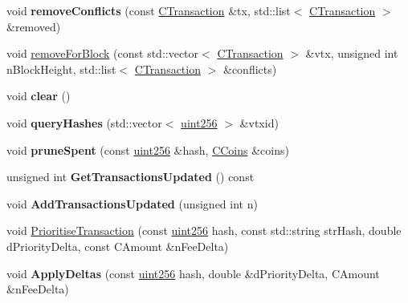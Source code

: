 \begin{DoxyCompactItemize}
\mbox{\label{class_c_tx_mem_pool_a11f1bddfbae7c03c6244db322876c0a7}} 
void {\bfseries remove\+Conflicts} (const \mbox{\hyperlink{class_c_transaction}{C\+Transaction}} \&tx, std\+::list$<$ \mbox{\hyperlink{class_c_transaction}{C\+Transaction}} $>$ \&removed)
\item 
void \mbox{\hyperlink{class_c_tx_mem_pool_ac97207311007676bd7ef056a625e0e0a}{remove\+For\+Block}} (const std\+::vector$<$ \mbox{\hyperlink{class_c_transaction}{C\+Transaction}} $>$ \&vtx, unsigned int n\+Block\+Height, std\+::list$<$ \mbox{\hyperlink{class_c_transaction}{C\+Transaction}} $>$ \&conflicts)
\item 
\mbox{\label{class_c_tx_mem_pool_a6dba6bce4139392751321438a29b6b09}} 
void {\bfseries clear} ()
\item 
\mbox{\label{class_c_tx_mem_pool_a42fa7d41a45562d02e356f2e7708bb02}} 
void {\bfseries query\+Hashes} (std\+::vector$<$ \mbox{\hyperlink{classuint256}{uint256}} $>$ \&vtxid)
\item 
\mbox{\label{class_c_tx_mem_pool_ad6142b7cd3a58dae6cdaf03551c2f989}} 
void {\bfseries prune\+Spent} (const \mbox{\hyperlink{classuint256}{uint256}} \&hash, \mbox{\hyperlink{class_c_coins}{C\+Coins}} \&coins)
\item 
\mbox{\label{class_c_tx_mem_pool_afd2a709a0e6cb34a57ff2f9fd0774e6c}} 
unsigned int {\bfseries Get\+Transactions\+Updated} () const
\item 
\mbox{\label{class_c_tx_mem_pool_a3039b67e5eebaa3ff830261c192816f2}} 
void {\bfseries Add\+Transactions\+Updated} (unsigned int n)
\item 
void \mbox{\hyperlink{class_c_tx_mem_pool_a1a0a00279c941051af1b74c5ebeac40d}{Prioritise\+Transaction}} (const \mbox{\hyperlink{classuint256}{uint256}} hash, const std\+::string str\+Hash, double d\+Priority\+Delta, const C\+Amount \&n\+Fee\+Delta)
\item 
\mbox{\label{class_c_tx_mem_pool_aa73d1d5a211150fe169d73dc25ba3cdd}} 
void {\bfseries Apply\+Deltas} (const \mbox{\hyperlink{classuint256}{uint256}} hash, double \&d\+Priority\+Delta, C\+Amount \&n\+Fee\+Delta)

\end{DoxyCompactItemize}
